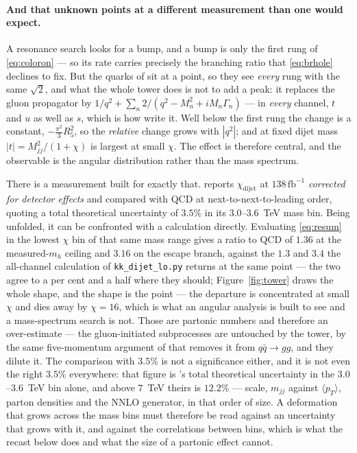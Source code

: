 \documentclass[11pt,a4paper]{article}
\begin{document}
\paragraph{And that unknown points at a different measurement than one would expect.} A resonance
search looks for a bump, and a bump is only the first rung of \eqref{eq:coloron} --- so its rate
carries precisely the branching ratio that \eqref{eq:brhole} declines to fix. But the quarks of
\cite{KM25} sit at a point, so they see \emph{every} rung with the same $\sqrt2$, and what the
whole tower does is not to add a peak: it replaces the gluon propagator by
$1/q^2+\sum_n2/(q^2-M_n^2+iM_n\Gamma_n)$ --- in \emph{every} channel, $t$ and $u$ as well as
$s$, which is how \cite{DMN01} write it. Well below the first rung the change is a constant,
$-\tfrac{\pi^2}{3}R_5^2$, so the \emph{relative} change grows with $|q^2|$; and at fixed dijet
mass $|t|=M_{jj}^2/(1+\chi)$ is largest at small $\chi$. The effect is therefore central, and
the observable is the angular distribution rather than the mass spectrum.

\noindent There is a measurement built for exactly that. \cite{CMSangular} reports
$\chi_{\mathrm{dijet}}$ at $138\,\mathrm{fb}^{-1}$ \emph{corrected for detector effects} and
compared with QCD at next-to-next-to-leading order, quoting a total theoretical uncertainty of
$3.5\%$ in its $3.0$--$3.6$~TeV mass bin. Being unfolded, it can be confronted with a calculation
directly. Evaluating \eqref{eq:resum} in the lowest $\chi$ bin of that same mass range gives a
ratio to QCD of $1.36$ at the measured-$m_h$ ceiling and $3.16$ on the escape branch, against the
$1.3$ and $3.4$ the all-channel calculation of \texttt{kk\_\allowbreak dijet\_\allowbreak lo.py}
returns at the same point --- the two agree to a per cent and a half where they should;
Figure~\ref{fig:tower} draws the whole shape, and the shape is the point --- the departure is
concentrated at small $\chi$ and dies away by $\chi=16$, which is what an angular analysis is
built to see and a mass-spectrum search is not.
Those are partonic numbers and therefore an over-estimate --- the gluon-initiated subprocesses are
untouched by the tower, by the same five-momentum argument of \cite{DMN01} that removes it from
$q\bar q\to gg$, and they dilute it. The comparison with $3.5\%$ is not a significance either, and
it is not even the right $3.5\%$ everywhere: that figure is \cite{CMSangular}'s total theoretical
uncertainty in the $3.0$--$3.6$~TeV bin alone, and above $7$~TeV theirs is $12.2\%$ --- scale,
$m_{jj}$ against $\langle p_T\rangle$, parton densities and the NNLO generator, in that order of
size. A deformation that grows across the mass bins must therefore be read against an uncertainty
that grows with it, and against the correlations between bins, which is what the recast below
does and what the size of a partonic effect cannot.
\end{document}
